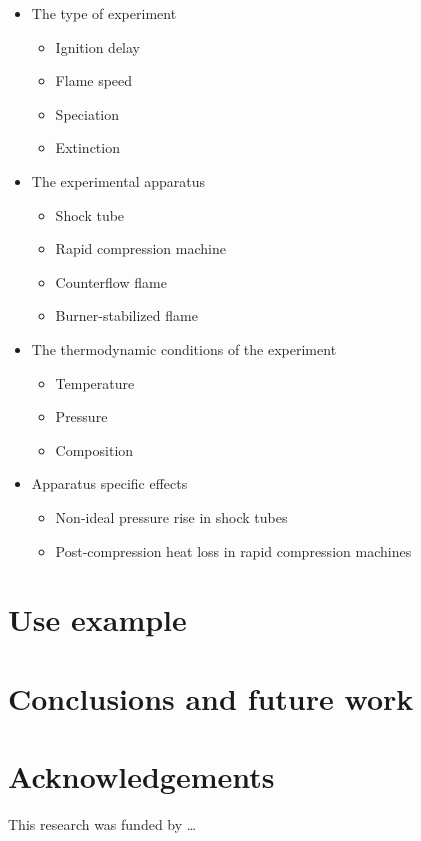 \documentclass[12pt]{ussci}
\begin{document}
\begin{itemize}
    \item The type of experiment
    \begin{itemize}
        \item Ignition delay
        \item Flame speed
        \item Speciation
        \item Extinction
    \end{itemize}
    \item The experimental apparatus
    \begin{itemize}
        \item Shock tube
        \item Rapid compression machine
        \item Counterflow flame
        \item Burner-stabilized flame
    \end{itemize}
    \item The thermodynamic conditions of the experiment
    \begin{itemize}
        \item Temperature
        \item Pressure
        \item Composition
    \end{itemize}
    \item Apparatus specific effects
    \begin{itemize}
        \item Non-ideal pressure rise in shock tubes
        \item Post-compression heat loss in rapid compression machines
    \end{itemize}
\end{itemize}


\section{Use example}
%


\section{Conclusions and future work}
%



\section{Acknowledgements}
This research was funded by \ldots
{}


\printbibliography
\end{document}
